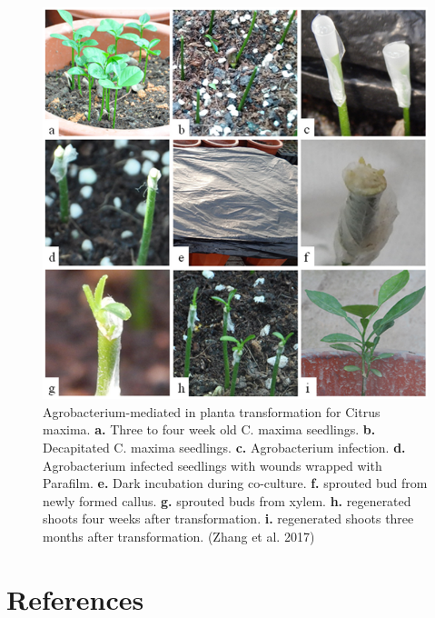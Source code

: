\documentclass[
]{article}
\begin{document}
\begin{figure}[H]

{\centering \includegraphics[width=0.8\linewidth]{Pommelo transformation} 

}

\caption{Agrobacterium-mediated in planta transformation for Citrus maxima. \textbf{a.} Three to four week old C. maxima seedlings. \textbf{b.} Decapitated C. maxima seedlings. \textbf{c.} Agrobacterium infection. \textbf{d.} Agrobacterium infected seedlings with wounds wrapped with Parafilm. \textbf{e.} Dark incubation during co-culture. \textbf{f.} sprouted bud from newly formed callus. \textbf{g.} sprouted buds from xylem. \textbf{h.} regenerated shoots four weeks after transformation. \textbf{i.} regenerated shoots three months after transformation. (Zhang et al. 2017)}\label{fig:Pommelo}
\end{figure}

\hypertarget{references}{%
\section*{References}\label{references}}
\end{document}
